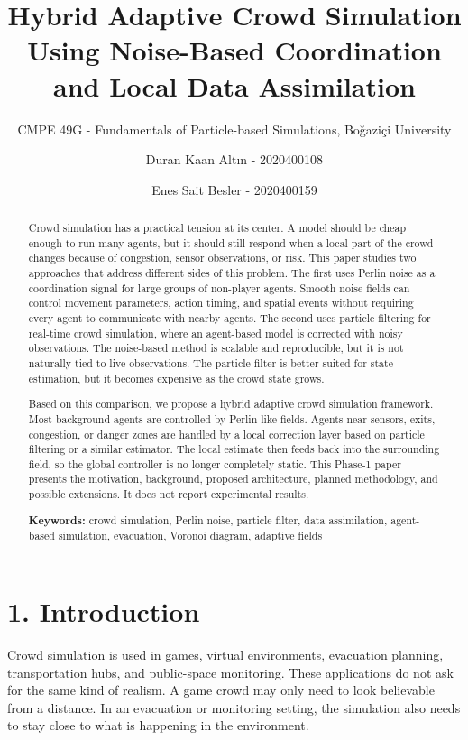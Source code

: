 \documentclass[
  11pt,
]{article}
\title{Hybrid Adaptive Crowd Simulation Using Noise-Based Coordination
and Local Data Assimilation}
\subtitle{CMPE 49G - Fundamentals of Particle-based Simulations,
Boğaziçi University}
\author{Duran Kaan Altın - 2020400108 \and Enes Sait Besler -
2020400159}
\date{}
\begin{document}
\maketitle

\begin{abstract}

Crowd simulation has a practical tension at its center. A model should
be cheap enough to run many agents, but it should still respond when a
local part of the crowd changes because of congestion, sensor
observations, or risk. This paper studies two approaches that address
different sides of this problem. The first uses Perlin noise as a
coordination signal for large groups of non-player agents. Smooth noise
fields can control movement parameters, action timing, and spatial
events without requiring every agent to communicate with nearby agents.
The second uses particle filtering for real-time crowd simulation, where
an agent-based model is corrected with noisy observations. The
noise-based method is scalable and reproducible, but it is not naturally
tied to live observations. The particle filter is better suited for
state estimation, but it becomes expensive as the crowd state grows.

Based on this comparison, we propose a hybrid adaptive crowd simulation
framework. Most background agents are controlled by Perlin-like fields.
Agents near sensors, exits, congestion, or danger zones are handled by a
local correction layer based on particle filtering or a similar
estimator. The local estimate then feeds back into the surrounding
field, so the global controller is no longer completely static. This
Phase-1 paper presents the motivation, background, proposed
architecture, planned methodology, and possible extensions. It does not
report experimental results.

\medskip

\noindent
\textbf{Keywords:} crowd simulation, Perlin noise, particle filter, data
assimilation, agent-based simulation, evacuation, Voronoi diagram,
adaptive fields

\end{abstract}

\section{1. Introduction}\label{introduction}

Crowd simulation is used in games, virtual environments, evacuation
planning, transportation hubs, and public-space monitoring. These
applications do not ask for the same kind of realism. A game crowd may
only need to look believable from a distance. In an evacuation or
monitoring setting, the simulation also needs to stay close to what is
happening in the environment.
\end{document}
